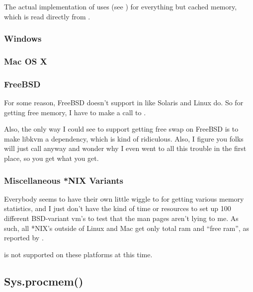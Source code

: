 The actual implementation of  uses  (see ) for everything but cached memory, which is read directly from .


\subsubsection{Windows}


\subsubsection{Mac OS X}





\subsubsection{FreeBSD}

For some reason, FreeBSD doesn't support  in  like Solaris and Linux do.  So for getting free memory, I have to make a call to .

Also, the only way I could see to support getting free swap on FreeBSD is to make libkvm a dependency, 
which is kind of ridiculous.  Also, I figure you folks will just call  anyway and 
wonder why I even went to all this trouble in the first place, so you get what you get.



\subsubsection{Miscellaneous *NIX Variants}

Everybody seems to have their own little wiggle to  for getting 
various memory statistics, and I just don't have the kind of time or resources 
to set up 100 different BSD-variant vm's to test that the man pages aren't lying 
to me.  As such, all *NIX's outside of Linux and Mac get only total ram and 
``free ram'', as reported by .

 is not supported on these platforms at this time.




\subsection{Sys.procmem()}


